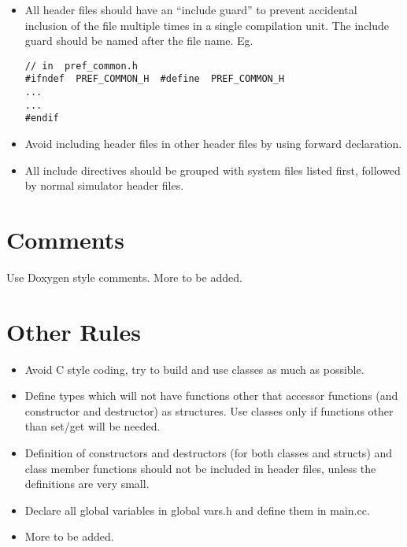 \begin{itemize}

  \item All header files should have an ``include guard'' to prevent
  accidental inclusion of the file multiple times in a single
  compilation unit.  The include guard should be named after the file
  name.  Eg.

\begin{Verbatim}
// in  pref_common.h
#ifndef  PREF_COMMON_H  #define  PREF_COMMON_H
...
...
#endif
\end{Verbatim}


  \item Avoid including header files in other header files by using
  forward declaration.

  \item All include directives should be grouped with system files
  listed first, followed by normal simulator header files.
\end{itemize}

\section{Comments}

Use Doxygen style comments. More to be added.


\section{Other Rules}

\begin{itemize}

  \item Avoid C style coding, try to build and use classes as much as
    possible.

  \item Define types which will not have functions other that accessor
    functions (and constructor and destructor) as structures. Use
    classes only if functions other than set/get will be needed.

  \item Definition of constructors and destructors (for both classes
    and structs) and class member functions should not be included in
    header files, unless the definitions are very small.

  \item Declare all global variables in global vars.h and define them
    in main.cc.

  \item More to be added.
\end{itemize}




